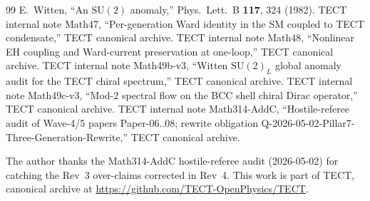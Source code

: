 \begin{thebibliography}{99}
 E.~Witten, ``An $\mathrm{SU}(2)$ anomaly,''
  Phys.\ Lett.\ B \textbf{117}, 324 (1982).
 TECT internal note Math47,
  ``Per-generation Ward identity in the SM coupled to TECT
  condensate,'' TECT canonical archive.
 TECT internal note Math48,
  ``Nonlinear EH coupling and Ward-current preservation at one-loop,''
  TECT canonical archive.
 TECT internal note Math49b-v3,
  ``Witten $\mathrm{SU}(2)_L$ global anomaly audit for the TECT
  chiral spectrum,'' TECT canonical archive.
 TECT internal note Math49c-v3,
  ``Mod-$2$ spectral flow on the BCC shell chiral Dirac operator,''
  TECT canonical archive.
 TECT internal note Math314-AddC,
  ``Hostile-referee audit of Wave-4/5 papers Paper-06..08; rewrite
  obligation Q-2026-05-02-Pillar7-Three-Generation-Rewrite,''
  TECT canonical archive.
\end{thebibliography}

\begin{acknowledgments}
The author thanks the Math314-AddC hostile-referee audit (2026-05-02)
for catching the Rev~3 over-claims corrected in Rev~4. This work is
part of TECT, canonical archive at
\url{https://github.com/TECT-OpenPhysics/TECT}.
\end{acknowledgments}


